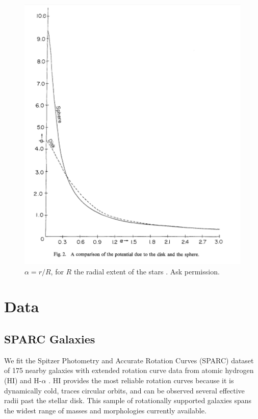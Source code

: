 \documentclass[reprint,%
 amsmath,amssymb,
 aps,
]{revtex4-1}
\begin{document}
  
  \begin{figure}
    \centering
    \includegraphics[width=\linewidth]{figures/Chatterjee_SphereDisk.png}
    \caption{ $\alpha = r/R$, for $R$ the radial extent of the stars \cite{Chatterjee}. Ask permission.}
    \label{fig:my_geom}
\end{figure}  
    
      
    

\section{Data \label{sec:data}}
 
 \subsection{SPARC Galaxies}
 We fit the Spitzer Photometry and Accurate Rotation Curves (SPARC) dataset  of  175 nearby galaxies with extended rotation curve data from atomic hydrogen (HI)  and H-$\alpha$ \cite{2016Lelli}. 
 HI provides the most reliable
 rotation curves because it is dynamically cold, traces circular orbits, and can be observed several effective radii past the stellar disk. 
 This sample of rotationally supported galaxies   spans the widest range of masses and morphologies currently available. 
 
\end{document}
